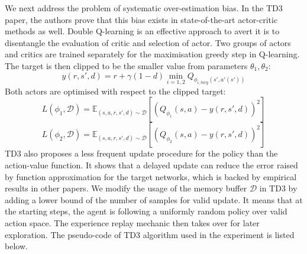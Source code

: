 \documentclass[oneside,11pt,a4paper]{article}
\begin{document}
\newline
\newline
\noindent
We next address the problem of systematic over-estimation bias. In the TD3 paper, the authors prove that this bias exists in state-of-the-art actor-critic methods as well. Double Q-learning is an effective approach to avert it is to disentangle the evaluation of critic and selection of actor. Two groups of actors and critics are trained separately for the maximisation greedy step in Q-learning. The target is then clipped to be the smaller value from parameters $\theta_1,\theta_2$:
$$
y(r,s',d) = r+\gamma(1-d) \min_{i=1,2}Q_{\phi_{i,targ}(s',a'(s'))}
$$
Both actors are optimised with respect to the clipped target:
$$
L(\phi_1,\mathcal D) = \mathbb E_{(s,a,r,s',d)\sim \mathcal D}[(Q_{\phi_1}(s,a) - y(r,s',d))^2] $$
$$L(\phi_2,\mathcal D) = \mathbb E_{(s,a,r,s',d)\sim \mathcal D}[(Q_{\phi_2}(s,a) - y(r,s',d))^2]
$$
TD3 also proposes a less frequent update procedure for the policy than the action-value function. It shows that a delayed update can reduce the error raised by function approximation for the target networks, which is backed by empirical results in other papers. We modify the usage of the memory buffer $\mathcal D$ in TD3 by adding a lower bound of the number of samples for valid update. It means that at the starting steps, the agent is following a uniformly random policy over valid action space. The experience replay mechanic then takes over for later exploration. The pseudo-code of TD3 algorithm used in the experiment is listed below.
\newline
\newline
\noindent
\end{document}

